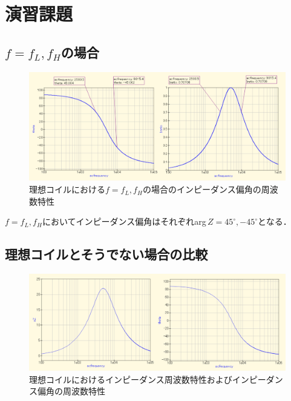 
\section{演習課題}

\subsection{$f=f_L,f_H$の場合}
\begin{figure}[H]
    \begin{center}
        \includegraphics[scale=0.5]{45.pdf}
        \caption{理想コイルにおける$f=f_L,f_H$の場合のインピーダンス偏角の周波数特性}
    \end{center}
\end{figure}

$f=f_L,f_H$においてインピーダンス偏角はそれぞれarg\,$Z=45^\circ,-45^\circ$となる．

\newpage

\subsection{理想コイルとそうでない場合の比較}
\begin{figure}[H]
    \begin{center}
        \includegraphics[scale=0.5]{ideal.pdf}
        \caption{理想コイルにおけるインピーダンス周波数特性およびインピーダンス偏角の周波数特性}
    \end{center}
\end{figure}

